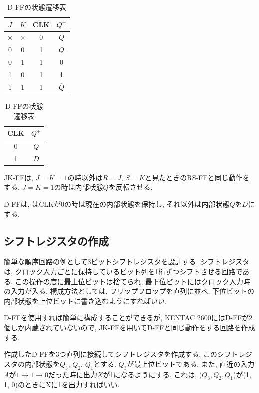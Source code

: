 \documentclass[titlepage]{jsarticle}
\begin{document}
    \begin{table}[h]
      \begin{minipage}{0.49\hsize}
        \centering
        \caption{JK-FFの状態遷移表}
        \begin{tabular}{ccc||c}
          \hline
          $J$ & $K$ & CLK & $Q^+$ \\ \hline \hline
          $\times$ & $\times$ & 0 & $Q$ \\
          0 & 0 & 1 & $Q$ \\
          0 & 1 & 1 & 0 \\
          1 & 0 & 1 & 1 \\
          1 & 1 & 1 & $\overline{Q}$ \\ \hline
        \end{tabular}
      \end{minipage}
      \begin{minipage}{0.49\hsize}
        \centering
        \caption{D-FFの状態遷移表}
        \begin{tabular}{c||c}
          \hline
          CLK & $Q^+$ \\ \hline \hline
          0 & $Q$ \\
          1 & $D$ \\ \hline
        \end{tabular}
      \end{minipage}
    \end{table}

    JK-FFは, $J = K = 1$の時以外は$R = J$, $S = K$と見たときのRS-FFと同じ動作をする.
    $J = K = 1$の時は内部状態$Q$を反転させる.

    D-FFは, はCLKが0の時は現在の内部状態を保持し, それ以外は内部状態$Q$を$D$にする.
  \subsection{シフトレジスタの作成}
    簡単な順序回路の例として3ビットシフトレジスタを設計する.
    シフトレジスタは, クロック入力ごとに保持しているビット列を1桁ずつシフトさせる回路である.
    この操作の度に最上位ビットは捨てられ, 最下位ビットにはクロック入力時の入力が入る.
    構成方法としては, フリップフロップを直列に並べ, 下位ビットの内部状態を上位ビットに書き込むようにすればいい.

    D-FFを使用すれば簡単に構成することができるが, KENTAC 2600にはD-FFが2個しか内蔵されていないので,
    JK-FFを用いてD-FFと同じ動作をする回路を作成する.

    作成したD-FFを3つ直列に接続してシフトレジスタを作成する.
    このシフトレジスタの内部状態を$Q_3$, $Q_2$, $Q_1$とする.
    $Q_3$が最上位ビットである.
    また, 直近の入力$A$が$1 \rightarrow 1 \rightarrow 0$だった時に出力$X$が1になるようにする.
    これは, ($Q_3, Q_2, Q_1$)が(1, 1, 0)のときにXに1を出力すればいい.
\end{document}
